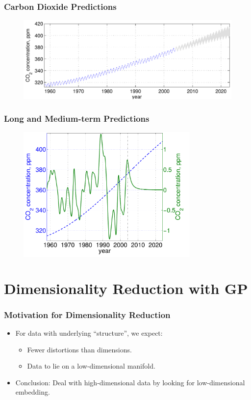 \documentclass[10pt]{beamer}
\begin{document}
  \begin{frame}
    \frametitle{Carbon Dioxide Predictions}

    \begin{figure}
      \centering
      \includegraphics[width=\textwidth]{prediction2.png}
    \end{figure}
  \end{frame}

  \begin{frame}
    \frametitle{Long and Medium-term Predictions}

    \begin{figure}
      \centering
      \includegraphics[width=0.8\textwidth]{prediction3.png}
    \end{figure}
  \end{frame}

  \section{Dimensionality Reduction with GP}

  \begin{frame}
  \frametitle{Motivation for Dimensionality Reduction}

  \begin{itemize}
    \item For data with underlying ``structure'', we expect:
      \begin{itemize}
        \item Fewer distortions than dimensions.
        \item Data to lie on a low-dimensional manifold.
      \end{itemize}
    \item Conclusion: Deal with high-dimensional data by looking for low-dimensional embedding.
  \end{itemize}

  \end{frame}
\end{document}
